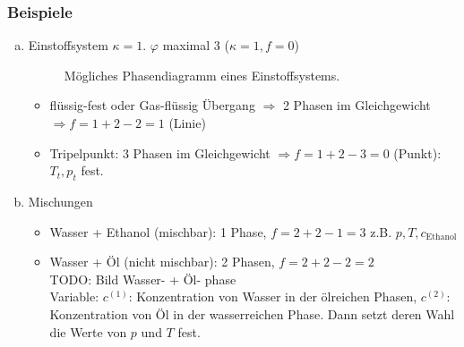 \subsubsection{Beispiele}
\begin{enumerate}[a)]
    \item Einstoffsystem $\kappa = 1$. $\varphi$ maximal 3 ($\kappa = 1, f = 0$) \\
    
    \begin{figure}[H]
        \centering
        \def\svgwidth{0.5\textwidth}
        
        \caption{Mögliches Phasendiagramm eines Einstoffsystems.}
        \label{img:pT-Gibbs}
    \end{figure}
    
    \begin{itemize}
        \item flüssig-fest oder Gas-flüssig Übergang $\Rightarrow$ 2 Phasen im Gleichgewicht $\Rightarrow f = 1 + 2 -2 = 1$ (Linie)
        \item Tripelpunkt: 3 Phasen im Gleichgewicht $\Rightarrow f = 1 + 2 - 3 = 0$ (Punkt): $T_t, p_t$ fest.
    \end{itemize}
    \item Mischungen
    \begin{itemize}
        \item Wasser + Ethanol (mischbar): 1 Phase, $f = 2 + 2 - 1 = 3$ z.B. $p, T, c_\text{Ethanol}$
        \item Wasser + Öl (nicht mischbar): 2 Phasen, $f = 2 + 2 - 2 = 2 $ \\
        TODO: Bild Wasser- + Öl- phase\\  %
        Variable: $c^{(1)}$: Konzentration von Wasser in der ölreichen Phasen, $c^{(2)}$: Konzentration von Öl in der wasserreichen Phase.
        Dann setzt deren Wahl die Werte von $p$ und $T$ fest.
    \end{itemize}
\end{enumerate}

